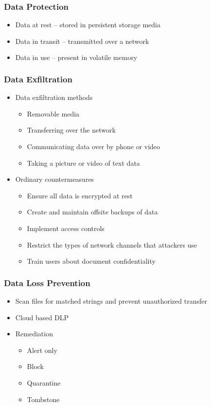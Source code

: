 		\subsubsection {Data Protection}
			\begin{itemize}
				\item Data at rest -- stored in persistent storage media
				\item Data in transit -- transmitted over a network
				\item Data in use -- present in volatile memory
			\end{itemize}
		\subsubsection {Data Exfiltration}
			\begin{itemize}
				\item Data exfiltration methods
					\begin{itemize}
						\item Removable media
						\item Transferring over the network
						\item Communicating data over by phone or video
						\item Taking a picture or video of text data
					\end{itemize}
				\item Ordinary countermeasures
					\begin{itemize}
						\item Ensure all data is encrypted at rest
						\item Create and maintain offsite backups of data
						\item Implement access controls
						\item Restrict the types of network channels that attackers use
						\item Train users about document confidentiality
					\end{itemize}
			\end{itemize}
		\subsubsection {Data Loss Prevention}
			\begin{itemize}
				\item Scan files for matched strings and prevent unauthorized transfer
				\item Cloud based DLP
				\item Remediation
					\begin{itemize}
						\item Alert only
						\item Block
						\item Quarantine
						\item Tombstone
					\end{itemize}
			\end{itemize}
